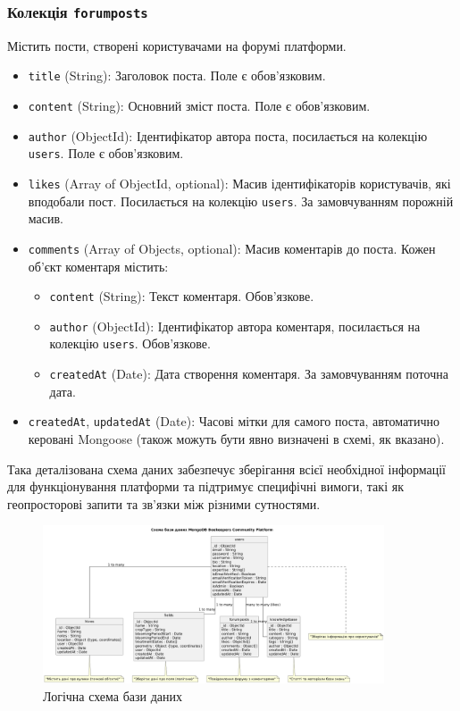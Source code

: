 \subsubsection*{Колекція \texttt{forumposts}}
Містить пости, створені користувачами на форумі платформи.
\begin{itemize}
    \item \texttt{title} (String): Заголовок поста. Поле є обов'язковим.
    \item \texttt{content} (String): Основний зміст поста. Поле є обов'язковим.
    \item \texttt{author} (ObjectId): Ідентифікатор автора поста, посилається на колекцію \texttt{users}. Поле є обов'язковим.
    \item \texttt{likes} (Array of ObjectId, optional): Масив ідентифікаторів користувачів, які вподобали пост. Посилається на колекцію \texttt{users}. За замовчуванням порожній масив.
    \item \texttt{comments} (Array of Objects, optional): Масив коментарів до поста. Кожен об'єкт коментаря містить:
    \begin{itemize}
        \item \texttt{content} (String): Текст коментаря. Обов'язкове.
        \item \texttt{author} (ObjectId): Ідентифікатор автора коментаря, посилається на колекцію \texttt{users}. Обов'язкове.
        \item \texttt{createdAt} (Date): Дата створення коментаря. За замовчуванням поточна дата.
    \end{itemize}
    \item \texttt{createdAt}, \texttt{updatedAt} (Date): Часові мітки для самого поста, автоматично керовані Mongoose (також можуть бути явно визначені в схемі, як вказано).
\end{itemize}
Така деталізована схема даних забезпечує зберігання всієї необхідної інформації для функціонування платформи та підтримує специфічні вимоги, такі як геопросторові запити та зв'язки між різними сутностями.

\begin{figure}[htbp]
  \centering
  \includegraphics[width=0.9\textwidth]{practice_report/images/db_schema.png}
  \caption{Логічна схема бази даних}
  \label{fig:db_schema}
\end{figure}

